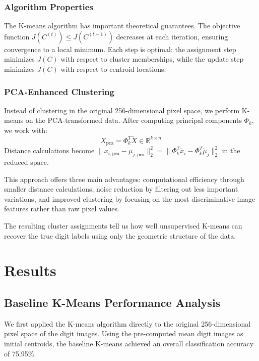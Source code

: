 \documentclass{article}
\begin{document}
\subsubsection{Algorithm Properties}
The K-means algorithm has important theoretical guarantees. The objective function $J(C^{(t)}) \leq J(C^{(t-1)})$ decreases at each iteration, ensuring convergence to a local minimum. Each step is optimal: the assignment step minimizes $J(C)$ with respect to cluster memberships, while the update step minimizes $J(C)$ with respect to centroid locations.

\subsubsection{PCA-Enhanced Clustering}
Instead of clustering in the original 256-dimensional pixel space, we perform K-means on the PCA-transformed data. After computing principal components $\Phi_k$, we work with: $$X_{\text{pca}} = \Phi_k^T \tilde{X} \in \mathbb{R}^{k \times n}$$ Distance calculations become $\|x_{i,\text{pca}} - \mu_{j,\text{pca}}\|_2^2 = \|\Phi_k^T\tilde{x}_i - \Phi_k^T\tilde{\mu}_j\|_2^2$ in the reduced space.

This approach offers three main advantages: computational efficiency through smaller distance calculations, noise reduction by filtering out less important variations, and improved clustering by focusing on the most discriminative image features rather than raw pixel values.

The resulting cluster assignments tell us how well unsupervised K-means can recover the true digit labels using only the geometric structure of the data.


\section{Results}
\subsection{Baseline K-Means Performance Analysis}
We first applied the K-means algorithm directly to the original 256-dimensional pixel space of the digit images. Using the pre-computed mean digit images as initial centroids, the baseline K-means achieved an overall classification accuracy of 75.95\%.
\end{document}
